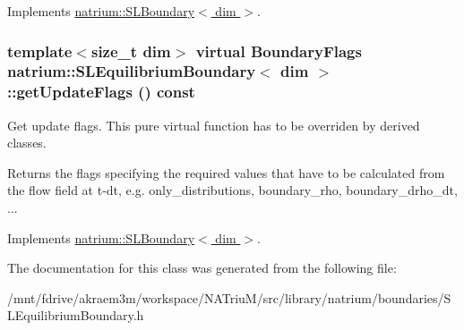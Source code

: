 Implements \hyperlink{classnatrium_1_1SLBoundary_a7c166745b087afdd137013f994733b89}{natrium::SLBoundary$<$ dim $>$}.\hypertarget{classnatrium_1_1SLEquilibriumBoundary_a09e349b179448c54a68245485be642f0}{
\subsubsection[{getUpdateFlags}]{\setlength{\rightskip}{0pt plus 5cm}template$<$size\_\-t dim$>$ virtual {\bf BoundaryFlags} {\bf natrium::SLEquilibriumBoundary}$<$ dim $>$::getUpdateFlags () const}}
\label{classnatrium_1_1SLEquilibriumBoundary_a09e349b179448c54a68245485be642f0}


Get update flags. This pure virtual function has to be overriden by derived classes. \begin{DoxyReturn}{Returns}
the flags specifying the required values that have to be calculated from the flow field at t-\/dt, e.g. only\_\-distributions, boundary\_\-rho, boundary\_\-drho\_\-dt, ... 
\end{DoxyReturn}


Implements \hyperlink{classnatrium_1_1SLBoundary_ad2b9a7f797b3af9b6493f9e9c5da5434}{natrium::SLBoundary$<$ dim $>$}.

The documentation for this class was generated from the following file:\begin{DoxyCompactItemize}
\item 
/mnt/fdrive/akraem3m/workspace/NATriuM/src/library/natrium/boundaries/SLEquilibriumBoundary.h\end{DoxyCompactItemize}
